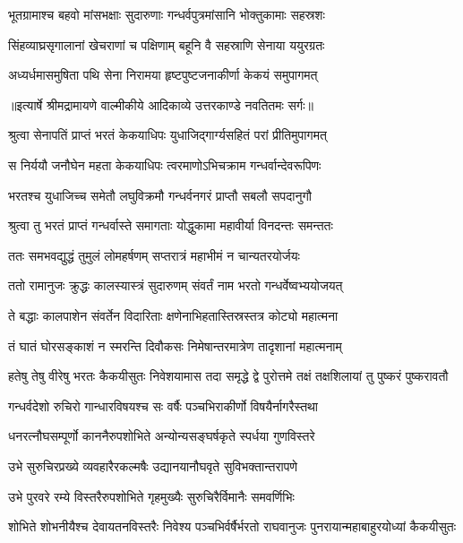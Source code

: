 \twolineshloka
{भूतग्रामाश्च बहवो मांसभक्षाः सुदारुणाः}
{गन्धर्वपुत्रमांसानि भोक्तुकामाः सहस्रशः} %

\twolineshloka
{सिंहव्याघ्रसृगालानां खेचराणां च पक्षिणाम्}
{बहूनि वै सहस्राणि सेनाया ययुरग्रतः} %

\twolineshloka
{अध्यर्धमासमुषिता पथि सेना निरामया}
{हृष्टपुष्टजनाकीर्णा केकयं समुपागमत्} %


{॥इत्यार्षे श्रीमद्रामायणे वाल्मीकीये आदिकाव्ये उत्तरकाण्डे नवतितमः सर्गः॥}


\twolineshloka
{श्रुत्वा सेनापतिं प्राप्तं भरतं केकयाधिपः}
{युधाजिद्गार्ग्यसहितं परां प्रीतिमुपागमत्} %

\twolineshloka
{स निर्ययौ जनौघेन महता केकयाधिपः}
{त्वरमाणोऽभिचक्राम गन्धर्वान्देवरूपिणः} %

\twolineshloka
{भरतश्च युधाजिच्च समेतौ लघुविक्रमौ}
{गन्धर्वनगरं प्राप्तौ सबलौ सपदानुगौ} %

\twolineshloka
{श्रुत्वा तु भरतं प्राप्तं गन्धर्वास्ते समागताः}
{योद्धुकामा महावीर्या विनदन्तः समन्ततः} %

\twolineshloka
{ततः समभवद्युद्धं तुमुलं लोमहर्षणम्}
{सप्तरात्रं महाभीमं न चान्यतरयोर्जयः} %

\twolineshloka
{ततो रामानुजः क्रुद्धः कालस्यास्त्रं सुदारुणम्}
{संवर्तं नाम भरतो गन्धर्वेष्वभ्ययोजयत्} %

\twolineshloka
{ते बद्धाः कालपाशेन संवर्तेन विदारिताः}
{क्षणेनाभिहतास्तिस्रस्तत्र कोट्यो महात्मना} %

\twolineshloka
{तं घातं घोरसङ्काशं न स्मरन्ति दिवौकसः}
{निमेषान्तरमात्रेण तादृशानां महात्मनाम्} %

\threelineshloka
{हतेषु तेषु वीरेषु भरतः कैकयीसुतः}
{निवेशयामास तदा समृद्धे द्वे पुरोत्तमे}
{तक्षं तक्षशिलायां तु पुष्करं पुष्करावतौ} %

\twolineshloka
{गन्धर्वदेशो रुचिरो गान्धारविषयश्च सः}
{वर्षैः पञ्चभिराकीर्णो विषयैर्नागरैस्तथा} %

\twolineshloka
{धनरत्नौघसम्पूर्णो काननैरुपशोभिते}
{अन्योन्यसङ्घर्षकृते स्पर्धया गुणविस्तरे} %

\twolineshloka
{उभे सुरुचिरप्रख्ये व्यवहारैरकल्मषैः}
{उद्यानयानौघवृते सुविभक्तान्तरापणे} %

\twolineshloka
{उभे पुरवरे रम्ये विस्तरैरुपशोभिते}
{गृहमुख्यैः सुरुचिरैर्विमानैः समवर्णिभिः} %

\threelineshloka
{शोभिते शोभनीयैश्च देवायतनविस्तरैः}
{निवेश्य पञ्चभिर्वर्षैर्भरतो राघवानुजः}
{पुनरायान्महाबाहुरयोध्यां कैकयीसुतः} %

